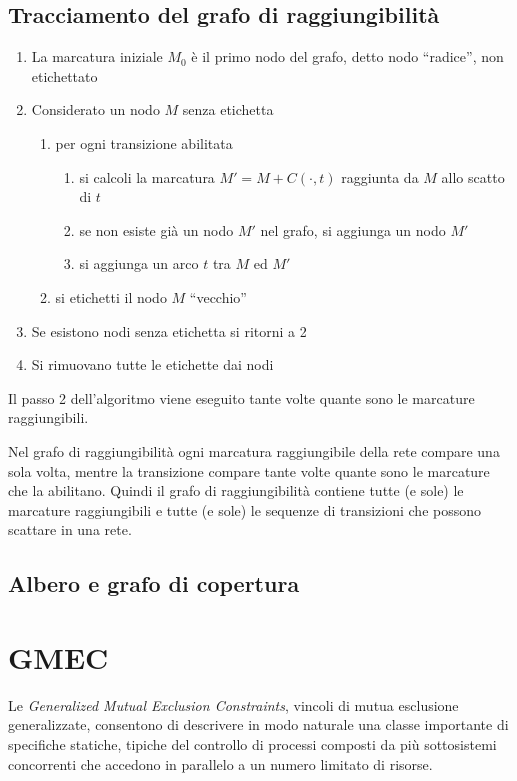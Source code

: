 \documentclass[a4paper]{report}
\begin{document}
\subsection{Tracciamento del grafo di raggiungibilit\`a}
\begin{enumerate}
\item La marcatura iniziale $M_0$ \`e il primo nodo del grafo, detto
  nodo ``radice'', non etichettato
\item Considerato un nodo $M$ senza etichetta
  \begin{enumerate}
  \item per ogni transizione abilitata
      \begin{enumerate}
      \item si calcoli la marcatura $M' = M + C(\cdot,t)$ raggiunta da
        $M$ allo scatto di $t$
      \item se non esiste gi\`a un nodo $M'$ nel grafo, si aggiunga un
        nodo $M'$
      \item si aggiunga un arco $t$ tra $M$ ed $M'$
      \end{enumerate}
    \item si etichetti il nodo $M$ ``vecchio''
  \end{enumerate}
\item Se esistono nodi senza etichetta si ritorni a 2
\item Si rimuovano tutte le etichette dai nodi
\end{enumerate}
Il passo 2 dell'algoritmo viene eseguito tante volte quante sono le
marcature raggiungibili. 

Nel grafo di raggiungibilit\`a ogni marcatura raggiungibile della rete
compare una sola volta, mentre la transizione compare tante volte
quante sono le marcature che la abilitano. Quindi il grafo di
raggiungibilit\`a contiene tutte (e sole) le marcature raggiungibili e
tutte (e sole) le sequenze di transizioni che possono scattare in una
rete.

\subsection{Albero e grafo di copertura}

\section{GMEC}
Le {\em Generalized Mutual Exclusion Constraints},
vincoli di mutua esclusione generalizzate, consentono di descrivere
in modo naturale una classe importante di specifiche statiche, tipiche
del controllo di processi composti da pi\`u sottosistemi concorrenti
che accedono in parallelo a un numero limitato di risorse.
\end{document}
